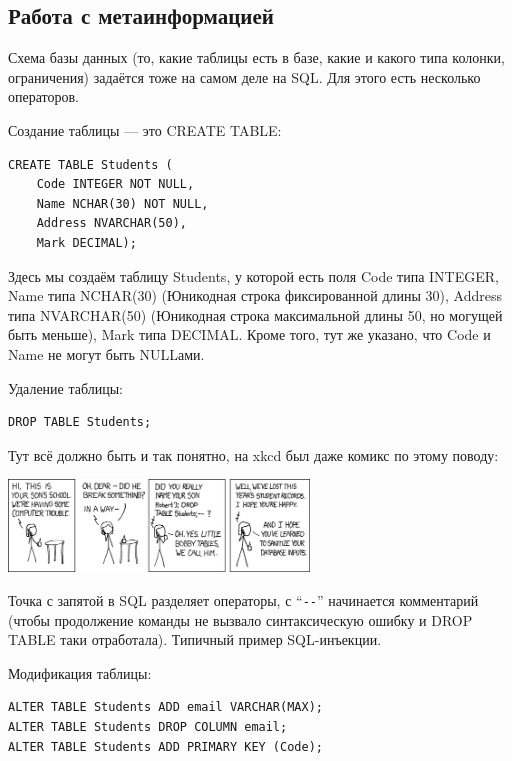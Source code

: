 \documentclass[a5paper]{article}
\begin{document}
\subsection{Работа с метаинформацией}

Схема базы данных (то, какие таблицы есть в базе, какие и какого типа колонки, ограничения) задаётся тоже на самом деле на SQL. Для этого есть несколько операторов.

Создание таблицы --- это CREATE TABLE:

\begin{verbatim}
CREATE TABLE Students (
    Code INTEGER NOT NULL,
    Name NCHAR(30) NOT NULL,
    Address NVARCHAR(50),
    Mark DECIMAL);
\end{verbatim}

Здесь мы создаём таблицу Students, у которой есть поля Code типа INTEGER, Name типа NCHAR(30) (Юникодная строка фиксированной длины 30), Address типа NVARCHAR(50) (Юникодная строка максимальной длины 50, но могущей быть меньше), Mark типа DECIMAL. Кроме того, тут же указано, что Code и Name не могут быть NULLами.

Удаление таблицы:

\begin{verbatim}
DROP TABLE Students;
\end{verbatim}

Тут всё должно быть и так понятно, на xkcd был даже комикс по этому поводу:

\begin{center}
    \includegraphics[width=0.6\textwidth]{bobbyTables.png}
\end{center}

Точка с запятой в SQL разделяет операторы, с ``\verb|--|'' начинается комментарий (чтобы продолжение команды не вызвало синтаксическую ошибку и DROP TABLE таки отработала). Типичный пример SQL-инъекции.

Модификация таблицы:

\begin{verbatim}
ALTER TABLE Students ADD email VARCHAR(MAX);
ALTER TABLE Students DROP COLUMN email;
ALTER TABLE Students ADD PRIMARY KEY (Code);
\end{verbatim}
\end{document}
